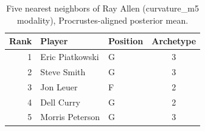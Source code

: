 \begin{table}[htbp]
  \centering\small
  \begin{tabular}{rllc}
    \toprule
    Rank & Player & Position & Archetype \\
    \midrule
    1 & Eric Piatkowski & G & 3 \\
    2 & Steve Smith & G & 3 \\
    3 & Jon Leuer & F & 2 \\
    4 & Dell Curry & G & 2 \\
    5 & Morris Peterson & G & 3 \\
    \bottomrule
  \end{tabular}
  \caption{Five nearest neighbors of Ray Allen (curvature_m5 modality), Procrustes-aligned posterior mean.}
  \label{tab:Ray_Allen_neighbors_curvature_m5}
\end{table}

